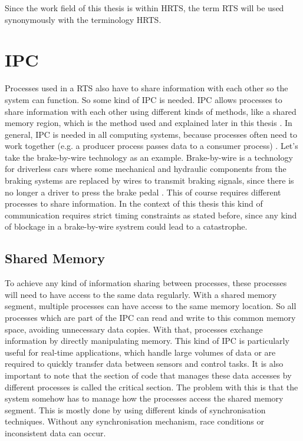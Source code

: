 Since the work field of this thesis is within \ac{HRTS}, the term \ac{RTS} will be used synonymously with the terminology \ac{HRTS}.

\section{\acf{IPC}}\label{sec:ipc}

Processes used in a \ac{RTS} also have to share information with each other so the system can function. So some kind of \ac{IPC} is needed. \ac{IPC} allows processes to share information with each other using different kinds of methods, like a shared memory region, which is the method used and explained later in this thesis \cite{IPCMechanisms}. In general, \ac{IPC} is needed in all computing systems, because processes often need to work together (e.g. a producer process passes data to a consumer process) \cite{IPCMechanisms}. Let's take the brake-by-wire technology as an example. Brake-by-wire is a technology for driverless cars where some mechanical and hydraulic components from the braking systems are replaced by wires to transmit braking signals, since there is no longer a driver to press the brake pedal \cite{BrakeByWire}. This of course requires different processes to share information. In the context of this thesis this kind of communication requires strict timing constraints as stated before, since any kind of blockage in a brake-by-wire systrem could lead to a catastrophe.

\subsection{Shared Memory}\label{subsec:shared-memory}

To achieve any kind of information sharing between processes, these processes will need to have access to the same data regularly. With a shared memory segment, multiple processes can have access to the same memory location. So all processes which are part of the \ac{IPC} can read and write to this common memory space, avoiding unnecessary data copies. With that, processes exchange information by directly manipulating memory. This kind of \ac{IPC} is particularly useful for real-time applications, which handle large volumes of data or are required to quickly transfer data between sensors and control tasks. It is also important to note that the section of code that manages these data accesses by different processes is called the critical section. The problem with this is that the system somehow has to manage how the processes access the shared memory segment. This is mostly done by using different kinds of synchronisation techniques. Without any synchronisation mechanism, race conditions or inconsistent data can occur. \cite{sharedmem}

